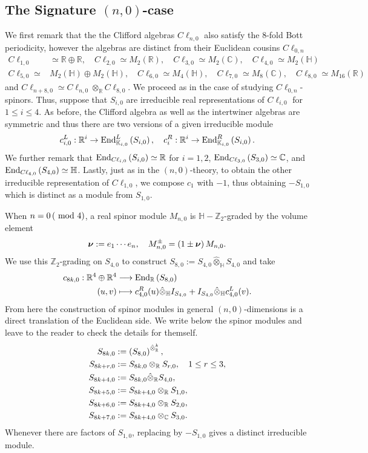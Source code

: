 \documentclass[openany, 11pt]{article}
\theoremstyle{definition}
\theoremstyle{remark}
\def\lp{\ensuremath{\left(}}
\def\rp{\ensuremath{\right)}}
\def\bC{\ensuremath{\mathbb{C}}}
\def\bH{\ensuremath{\mathbb{H}}}
\def\bR{\ensuremath{\mathbb{R}}}
\def\bZ{\ensuremath{\mathbb{Z}}}
\def\bK{\ensuremath{\mathbb{K}}}
\def\End{\ensuremath{\textnormal{End}}}
\begin{document}
\subsection{The Signature $(n,0)$-case}
We first remark that the the Clifford algebras $C\ell_{n,0}$ also satisfy the $8$-fold Bott periodicity, however the algebras are distinct from their Euclidean cousins $C\ell_{0,n}$
\begin{align*}
    C\ell_{1,0}&\simeq\bR\oplus\bR,\quad
    C\ell_{2,0}\simeq M_2(\bR),\quad
    C\ell_{3,0}\simeq M_2(\bC),\quad
    C\ell_{4,0}\simeq M_2(\bH)\\
    C\ell_{5,0}\simeq &M_2(\bH)\oplus M_2(\bH),\quad
    C\ell_{6,0}\simeq M_4(\bH),\quad
    C\ell_{7,0}\simeq M_8(\bC),\quad
    C\ell_{8,0}\simeq M_{16}(\bR)
\end{align*}
and $C\ell_{n+8,0}\simeq C\ell_{n,0}\otimes_{\bR}C\ell_{8,0}$. We proceed as in the case of studying $C\ell_{0,n}$-spinors. Thus, suppose that $S_{i,0}$ are irreducible real representations of $C\ell_{i,0}$ for $1\leq i\leq 4$. As before, the Clifford algebra as well as the intertwiner algebras are symmetric and thus there are two versions of a given irreducible module
\[
    c_{i,0}^L:\bR^i\rightarrow\End^L_{\bK_{i,0}}\lp S_{i,0}\rp,\quad c^R_i:\bR^i\rightarrow\End^R_{\bK_{i,0}}\lp S_{i,0}\rp.
\]
We further remark that $\End_{C\ell_{i,0}}\lp S_{i,0}\rp\simeq \bR$ for $i=1,2$, $\End_{C\ell_{3,0}}\lp S_{3,0}\rp\simeq \bC$, and $\End_{C\ell_{4,0}}\lp S_{4,0}\rp\simeq\bH$. Lastly, just as in the $(n,0)$-theory, to obtain the other irreducible representation of $C\ell_{1,0}$, we compose $c_1$ with $-1$, thus obtaining $-S_{1,0}$ which is distinct as a module from $S_{1,0}$.\par
When $n=0\lp\text{ mod }4\rp$, a real spinor module $M_{n,0}$ is $\bH-\bZ_2$-graded by the volume element
\[
    \boldsymbol{\nu}:=e_1\cdots e_n, \quad M^{\pm}_{n,0}=\lp 1\pm\boldsymbol{\nu}\rp M_{n,0}.
\]
We use this $\bZ_2$-grading on $S_{4,0}$ to construct $S_{8,0}:=S_{4,0}\hat{\otimes}_{\bH}S_{4,0}$ and take
\begin{align*}
    c_{8k,0}:\bR^4\oplus\bR^4&\longrightarrow \End_{\bR}\lp S_{8,0}\rp\\
    \lp u,v\rp&\longmapsto c^R_{4,0}(u)\hat{\otimes}_{\bH}I_{S_{4,0}}+I_{S_{4,0}}\hat{\otimes}_{\bH}c^L_{4,0}(v).
\end{align*}
From here the construction of spinor modules in general $(n,0)$-dimensions is a direct translation of the Euclidean side. We write below the spinor modules and leave to the reader to check the details for themself.
\begin{align*}
    S_{8k,0}&:=\lp S_{8,0}\rp^{\hat{\otimes}^k_{\bR}},\\
    S_{8k+r,0}&:=S_{8k,0}\otimes_{\bR}S_{r,0},\quad 1\leq r\leq 3,\\
    S_{8k+4,0}&:=S_{8k,0}\hat{\otimes}_{\bR}S_{4,0},\\
    S_{8k+5,0}&:=S_{8k+4,0}\otimes_{\bR}S_{1,0},\\
    S_{8k+6,0}&:=S_{8k+4,0}\otimes_{\bR}S_{2,0},\\
    S_{8k+7,0}&:=S_{8k+4,0}\otimes_{\bC}S_{3,0}.
\end{align*}
Whenever there are factors of $S_{1,0}$, replacing by $-S_{1,0}$ gives a distinct irreducible module.
\end{document}
